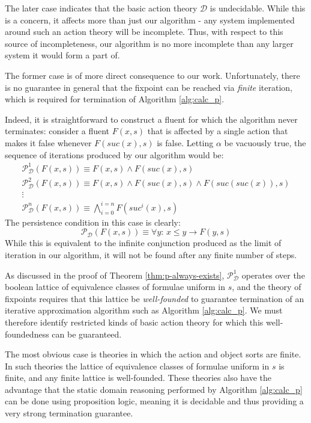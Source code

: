 The later case indicates that the basic action theory $\mathcal{D}$
is undecidable. While this is a concern, it affects more than just
our algorithm - any system implemented around such an action theory
will be incomplete. Thus, with respect to this source of incompleteness,
our algorithm is no more incomplete than any larger system it would
form a part of.

The former case is of more direct consequence to our work. Unfortunately,
there is no guarantee in general that the fixpoint can be reached
via \emph{finite} iteration, which is required for termination of
Algorithm \ref{alg:calc_p}.

Indeed, it is straightforward to construct a fluent for which the
algorithm never terminates: consider a fluent $F(x,s)$ that is affected
by a single action that makes it false whenever $F(suc(x),s)$ is
false. Letting $\alpha$ be vacuously true, the sequence of iterations
produced by our algorithm would be:\begin{gather*}
\mathcal{P}_{\mathcal{D}}^{1}(F(x,s))\equiv F(x,s)\wedge F(suc(x),s)\\
\mathcal{P}_{\mathcal{D}}^{2}(F(x,s))\equiv F(x,s)\wedge F(suc(x),s)\wedge F(suc(suc(x)),s)\\
\vdots\\
\mathcal{P}_{\mathcal{D}}^{n}(F(x,s))\equiv\bigwedge_{i=0}^{i=n}F(suc^{i}(x),s)\end{gather*}
 The persistence condition in this case is clearly: \[
\mathcal{P}_{\mathcal{D}}(F(x,s))\equiv\forall y:\, x\leq y\rightarrow F(y,s)\]
 While this is equivalent to the infinite conjunction produced as
the limit of iteration in our algorithm, it will not be found after
any finite number of steps.

As discussed in the proof of Theorem \ref{thm:p-always-exists}, $\mathcal{P}_{\mathcal{D}}^{1}$
operates over the boolean lattice of equivalence classes of formulae
uniform in $s$, and the theory of fixpoints requires that this lattice
be \emph{well-founded} to guarantee termination of an iterative approximation
algorithm such as Algorithm \ref{alg:calc_p}. We must therefore identify
restricted kinds of basic action theory for which this well-foundedness
can be guaranteed.

The most obvious case is theories in which the action and object sorts
are finite. In such theories the lattice of equivalence classes of
formulae uniform in $s$ is finite, and any finite lattice is well-founded.
These theories also have the advantage that the static domain reasoning
performed by Algorithm \ref{alg:calc_p} can be done using proposition
logic, meaning it is decidable and thus providing a very strong termination
guarantee.

